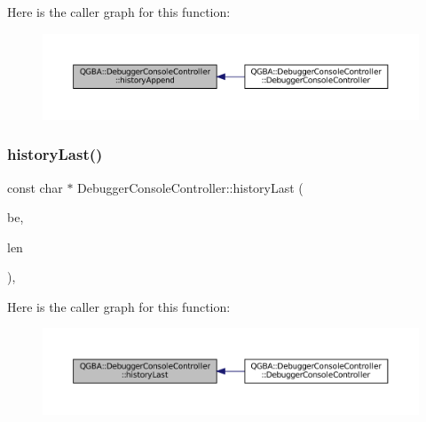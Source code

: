 Here is the caller graph for this function\+:
\nopagebreak
\begin{figure}[H]
\begin{center}
\leavevmode
\includegraphics[width=350pt]{class_q_g_b_a_1_1_debugger_console_controller_a4db0f8c964e69b7fde4e5bc79f30353e_icgraph}
\end{center}
\end{figure}
\mbox{\label{class_q_g_b_a_1_1_debugger_console_controller_afda20b5c97f454990907a2f016ea62a7}} 
\subsubsection{\texorpdfstring{history\+Last()}{historyLast()}}
{\footnotesize\ttfamily const char $\ast$ Debugger\+Console\+Controller\+::history\+Last (\begin{DoxyParamCaption}\item[{struct C\+L\+I\+Debugger\+Backend $\ast$}]{be,  }\item[{size\+\_\+t $\ast$}]{len }\end{DoxyParamCaption})\hspace{0.3cm}{\ttfamily [static]}, {\ttfamily [private]}}

Here is the caller graph for this function\+:
\nopagebreak
\begin{figure}[H]
\begin{center}
\leavevmode
\includegraphics[width=350pt]{class_q_g_b_a_1_1_debugger_console_controller_afda20b5c97f454990907a2f016ea62a7_icgraph}
\end{center}
\end{figure}
\mbox{\label{class_q_g_b_a_1_1_debugger_console_controller_a1c0f033ca89799d97112aedf238b4cf9}} 
